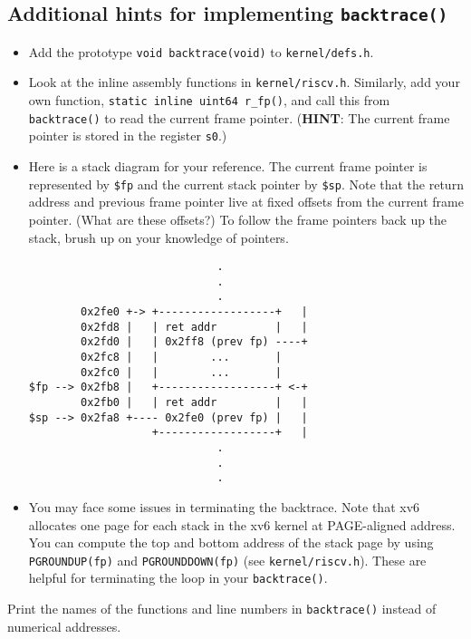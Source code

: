 \documentclass[11pt]{exam}
\begin{document}
\begin{questions}
\begin{parts}
\begin{solution}

\end{solution}

\end{parts}

\subsection*{Additional hints for implementing \texttt{backtrace()}}

\begin{itemize}
    \item Add the prototype \texttt{void backtrace(void)} to {\tt kernel/defs.h}.
    \item Look at the inline assembly functions in {\tt kernel/riscv.h}. Similarly, add your own function, \texttt{static inline uint64 r\_fp()}, and call this from {\tt backtrace()} to read the current frame pointer. (\textbf{HINT}: The current frame pointer is stored in the register \texttt{s0}.)
    \item Here is a stack diagram for your reference. The current frame pointer is represented by \texttt{\$fp} and the current stack pointer by \texttt{\$sp}. Note that the return address and previous frame pointer live at fixed offsets from the current frame pointer. (What are these offsets?) To follow the frame pointers back up the stack, brush up on your knowledge of pointers.
    \begin{verbatim}
                             .
                             .
                             .
        0x2fe0 +-> +------------------+   |
        0x2fd8 |   | ret addr         |   |
        0x2fd0 |   | 0x2ff8 (prev fp) ----+
        0x2fc8 |   |        ...       |
        0x2fc0 |   |        ...       |
$fp --> 0x2fb8 |   +------------------+ <-+
        0x2fb0 |   | ret addr         |   |
$sp --> 0x2fa8 +---- 0x2fe0 (prev fp) |   |
                   +------------------+   |
                             .
                             .
                             .
    \end{verbatim}
    \item You may face some issues in terminating the backtrace. Note that xv6 allocates one page for each stack in the xv6 kernel at PAGE-aligned address. You can compute the top and bottom address of the stack page by using {\tt PGROUNDUP(fp)} and {\tt PGROUNDDOWN(fp)} (see {\tt kernel/riscv.h}). These are helpful for terminating the loop in your \texttt{backtrace()}.
\end{itemize}


\question[30] {\bf [OPTIONAL]} Print the names of the functions and line numbers in {\tt backtrace()} instead of numerical addresses.


\end{questions}
\end{document}
